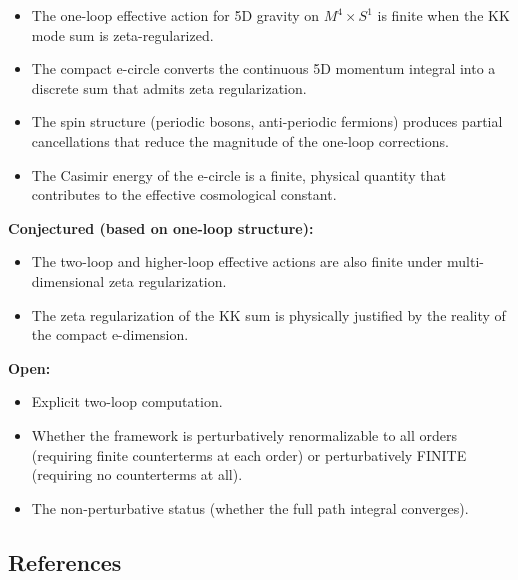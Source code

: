 \documentclass[aps,prd,preprint,superscriptaddress,longbibliography,floatfix]{revtex4-2}
\theoremstyle{remark}
\begin{document}
\begin{itemize}
  \item The one-loop effective action for 5D gravity on $M^{4} \times S^{1}$ is finite when the KK mode sum is zeta-regularized.
  \item The compact e-circle converts the continuous 5D momentum integral into a discrete sum that admits zeta regularization.
  \item The spin structure (periodic bosons, anti-periodic fermions) produces partial cancellations that reduce the magnitude of the one-loop corrections.
  \item The Casimir energy of the e-circle is a finite, physical quantity that contributes to the effective cosmological constant.
\end{itemize}

\textbf{Conjectured (based on one-loop structure):}

\begin{itemize}
  \item The two-loop and higher-loop effective actions are also finite under multi-dimensional zeta regularization.
  \item The zeta regularization of the KK sum is physically justified by the reality of the compact e-dimension.
\end{itemize}

\textbf{Open:}

\begin{itemize}
  \item Explicit two-loop computation.
  \item Whether the framework is perturbatively renormalizable to all orders (requiring finite counterterms at each order) or perturbatively FINITE (requiring no counterterms at all).
  \item The non-perturbative status (whether the full path integral converges).
\end{itemize}



\subsection{References}
\end{document}

